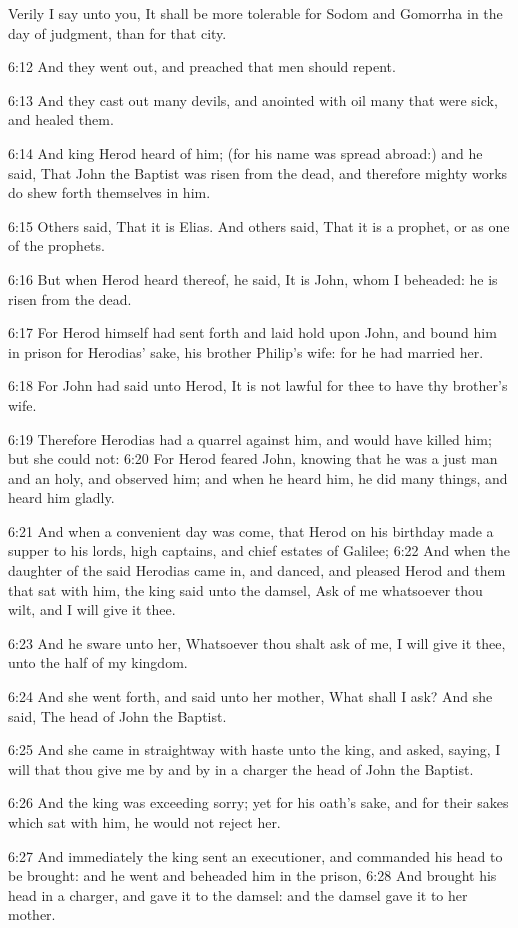 Verily I say unto you, It shall be more tolerable for Sodom and Gomorrha in the day of judgment, than for that city.

6:12 And they went out, and preached that men should repent.

6:13 And they cast out many devils, and anointed with oil many that were sick, and healed them.

6:14 And king Herod heard of him; (for his name was spread abroad:) and he said, That John the Baptist was risen from the dead, and therefore mighty works do shew forth themselves in him.

6:15 Others said, That it is Elias. And others said, That it is a prophet, or as one of the prophets.

6:16 But when Herod heard thereof, he said, It is John, whom I beheaded: he is risen from the dead.

6:17 For Herod himself had sent forth and laid hold upon John, and bound him in prison for Herodias' sake, his brother Philip's wife: for he had married her.

6:18 For John had said unto Herod, It is not lawful for thee to have thy brother's wife.

6:19 Therefore Herodias had a quarrel against him, and would have killed him; but she could not: 6:20 For Herod feared John, knowing that he was a just man and an holy, and observed him; and when he heard him, he did many things, and heard him gladly.

6:21 And when a convenient day was come, that Herod on his birthday made a supper to his lords, high captains, and chief estates of Galilee; 6:22 And when the daughter of the said Herodias came in, and danced, and pleased Herod and them that sat with him, the king said unto the damsel, Ask of me whatsoever thou wilt, and I will give it thee.

6:23 And he sware unto her, Whatsoever thou shalt ask of me, I will give it thee, unto the half of my kingdom.

6:24 And she went forth, and said unto her mother, What shall I ask?  And she said, The head of John the Baptist.

6:25 And she came in straightway with haste unto the king, and asked, saying, I will that thou give me by and by in a charger the head of John the Baptist.

6:26 And the king was exceeding sorry; yet for his oath's sake, and for their sakes which sat with him, he would not reject her.

6:27 And immediately the king sent an executioner, and commanded his head to be brought: and he went and beheaded him in the prison, 6:28 And brought his head in a charger, and gave it to the damsel: and the damsel gave it to her mother.

